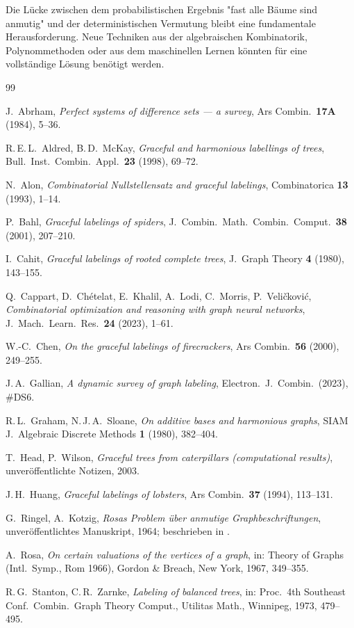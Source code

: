 \documentclass[12pt,a4paper]{amsart}
\theoremstyle{definition}
\theoremstyle{remark}
\begin{document}
Die Lücke zwischen dem probabilistischen Ergebnis "fast alle Bäume sind anmutig"
und der deterministischen Vermutung bleibt eine fundamentale Herausforderung.
Neue Techniken aus der algebraischen Kombinatorik, Polynommethoden oder aus dem
maschinellen Lernen könnten für eine vollständige Lösung benötigt werden.

\begin{thebibliography}{99}

J.~Abrham,
\textit{Perfect systems of difference sets --- a survey},
Ars Combin.\ \textbf{17A} (1984), 5--36.

R.\,E.\,L.~Aldred, B.\,D.~McKay,
\textit{Graceful and harmonious labellings of trees},
Bull.\ Inst.\ Combin.\ Appl.\ \textbf{23} (1998), 69--72.

N.~Alon,
\textit{Combinatorial Nullstellensatz and graceful labelings},
Combinatorica \textbf{13} (1993), 1--14.

P.~Bahl,
\textit{Graceful labelings of spiders},
J.\ Combin.\ Math.\ Combin.\ Comput.\ \textbf{38} (2001), 207--210.

I.~Cahit,
\textit{Graceful labelings of rooted complete trees},
J.\ Graph Theory \textbf{4} (1980), 143--155.

Q.~Cappart, D.~Chételat, E.~Khalil, A.~Lodi, C.~Morris, P.~Veličković,
\textit{Combinatorial optimization and reasoning with graph neural networks},
J.\ Mach.\ Learn.\ Res.\ \textbf{24} (2023), 1--61.

W.-C.~Chen,
\textit{On the graceful labelings of firecrackers},
Ars Combin.\ \textbf{56} (2000), 249--255.

J.\,A.~Gallian,
\textit{A dynamic survey of graph labeling},
Electron.\ J.\ Combin.\ (2023), \#DS6.

R.\,L.~Graham, N.\,J.\,A.~Sloane,
\textit{On additive bases and harmonious graphs},
SIAM J.\ Algebraic Discrete Methods \textbf{1} (1980), 382--404.

T.~Head, P.~Wilson,
\textit{Graceful trees from caterpillars (computational results)},
unveröffentlichte Notizen, 2003.

J.\,H.~Huang,
\textit{Graceful labelings of lobsters},
Ars Combin.\ \textbf{37} (1994), 113--131.

G.~Ringel, A.~Kotzig,
\textit{Rosas Problem über anmutige Graphbeschriftungen},
unveröffentlichtes Manuskript, 1964; beschrieben in \cite{Rosa1967}.

A.~Rosa,
\textit{On certain valuations of the vertices of a graph},
in: Theory of Graphs (Intl.\ Symp., Rom 1966), Gordon \& Breach,
New York, 1967, 349--355.

R.\,G.~Stanton, C.\,R.~Zarnke,
\textit{Labeling of balanced trees},
in: Proc.\ 4th Southeast Conf.\ Combin.\ Graph Theory Comput.,
Utilitas Math., Winnipeg, 1973, 479--495.

\end{thebibliography}
\end{document}
